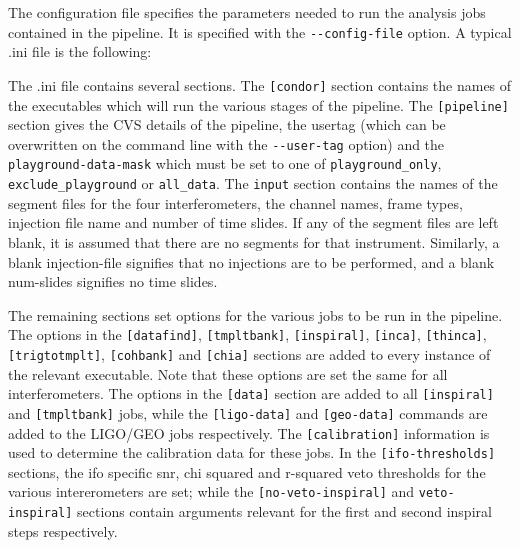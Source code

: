 \begin{entry}
The configuration file specifies the parameters needed to run the analysis jobs
contained in the pipeline.  It is specified with the \verb$--config-file$
option.  A typical .ini file is the following: 

  

The .ini file contains several sections.  The \verb$[condor]$ section contains
the names of the executables which will run the various stages of the
pipeline.  The \verb$[pipeline]$ section gives the CVS details of the
pipeline, the usertag (which can be overwritten on the command line with the
\verb$--user-tag$ option) and the \verb$playground-data-mask$ which must be
set to one of \verb$playground_only$, \verb$exclude_playground$ or
\verb$all_data$.  The \verb$input$ section contains the names of the segment
files for the four interferometers, the channel names, frame types, injection
file name and number of time slides.  If any of the segment files are left
blank, it is assumed that there are no segments for that instrument.
Similarly, a blank injection-file signifies that no injections are to be
performed, and a blank num-slides signifies no time slides.

The remaining sections set options for the various jobs to be run in the
pipeline.  The options in the \verb$[datafind]$, \verb$[tmpltbank]$,
\verb$[inspiral]$, \verb$[inca]$, \verb$[thinca]$, \verb$[trigtotmplt]$,
\verb$[cohbank]$ and \verb$[chia]$ sections are added to every instance of the
relevant executable.  Note that these options are set the same for all
interferometers.  The options in the \verb$[data]$ section are added to all
\verb$[inspiral]$ and \verb$[tmpltbank]$ jobs, while the \verb$[ligo-data]$
and \verb$[geo-data]$ commands are added to the LIGO/GEO jobs respectively.
The \verb$[calibration]$ information is used to determine the calibration data
for these jobs.  In the \verb$[ifo-thresholds]$ sections, the ifo specific
snr, chi squared and r-squared veto thresholds for the various intererometers
are set; while the \verb$[no-veto-inspiral]$ and \verb$veto-inspiral]$
sections contain arguments relevant for the first and second inspiral steps
respectively.  


\end{entry}

